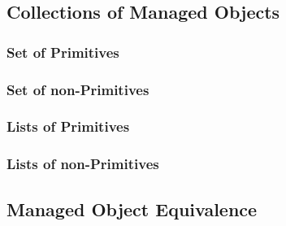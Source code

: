 \subsection{Collections of Managed Objects}\label{subsec:Collections of Managed Objects}

\subsubsection{Set of Primitives}
\subsubsection{Set of non-Primitives}
\subsubsection{Lists of Primitives}
\subsubsection{Lists of non-Primitives}

\subsection{Managed Object Equivalence}\label{subsec:Managed Object equivalence}

